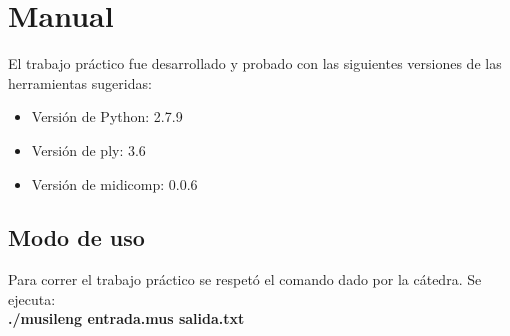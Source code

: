 \section{Manual}

El trabajo práctico fue desarrollado y probado con las siguientes versiones de las herramientas sugeridas:
\begin{itemize}
	\item Versión de Python: 2.7.9
	\item Versión de ply: 3.6
	\item Versión de midicomp: 0.0.6
\end{itemize}

\subsection*{Modo de uso}
Para correr el trabajo práctico se respetó el comando dado por la cátedra. Se ejecuta: \\
\indent \textbf{./musileng entrada.mus salida.txt}

\clearpage
